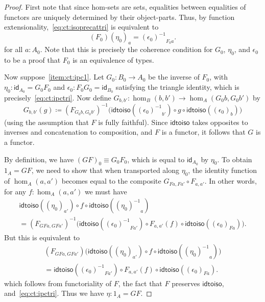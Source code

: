 \documentclass{mscs}
\newcommand{\jdeq}{\equiv}      %
\newcommand{\defeq}{\coloneqq}  %
\newcommand{\opp}[1]{\mathord{{#1}^{-1}}}
\newcommand{\map}[2]{\ensuremath{{#1}\left({#2}\right)}\xspace}
\newcommand{\idfunc}[1][]{\ensuremath{\mathsf{id}_{#1}}\xspace}
\numberwithin{equation}{section}
\newcommand{\inv}[1]{{#1}^{-1}}
\newcommand{\idtoiso}{\ensuremath{\mathsf{idtoiso}}\xspace}
\begin{document}
\begin{proof}
  First note that since hom-sets are sets, equalities between equalities of functors are uniquely determined by their object-parts.
  Thus, by function extensionality,~\eqref{eq:ct:isoprecattri} is equivalent to
  \begin{equation}
    \map{(F_0)}{\eta_0}_a = \opp{(\epsilon_0)}_{F_0 a}.\label{eq:ct:ipctri}
  \end{equation}
  for all $a:A_0$.
  Note that this is precisely the coherence condition for $G_0$, $\eta_0$, and $\epsilon_0$ to be a proof that $F_0$ is an equivalence of types.

  Now suppose~\ref{item:ct:ipc1}.
  Let $G_0:B_0 \to A_0$ be the inverse of $F_0$, with $\eta_0: \idfunc[A_0] = G_0 F_0$ and $\epsilon_0:F_0G_0 = \idfunc[B_0]$ satisfying the triangle identity, which is precisely~\eqref{eq:ct:ipctri}.
  Now define $G_{b,b'}:\hom_B(b,b') \to \hom_A(G_0b,G_0b')$ by
  \[ G_{b,b'}(g) \defeq
  \inv{(F_{G_0b,G_0b'})}\Big(\idtoiso(\opp{(\epsilon_0)}_{b'}) \circ g \circ \idtoiso((\epsilon_0)_b)\Big)
  \]
  (using the assumption that $F$ is fully faithful).
  Since \idtoiso takes opposites to inverses and concatenation to composition, and $F$ is a functor, it follows that $G$ is a functor.

  By definition, we have $(GF)_0 \jdeq G_0 F_0$, which is equal to $\idfunc[A_0]$ by $\eta_0$.
  To obtain $1_A = GF$, we need to show that when transported along $\eta_0$, the identity function of $\hom_A(a,a')$ becomes equal to the composite $G_{Fa,Fa'} \circ F_{a,a'}$.
  In other words, for any $f:\hom_A(a,a')$ we must have
  \begin{multline*}
    \idtoiso((\eta_0)_{a'}) \circ f \circ \idtoiso(\opp{(\eta_0)}_a)\\
    = \inv{(F_{GFa,GFa'})}\Big(\idtoiso(\opp{(\epsilon_0)}_{Fa'})
    \circ F_{a,a'}(f) \circ \idtoiso((\epsilon_0)_{Fa})\Big).
  \end{multline*}
  But this is equivalent to
  \begin{multline*}
    (F_{GFa,GFa'})\Big(\idtoiso((\eta_0)_{a'}) \circ f \circ \idtoiso(\opp{(\eta_0)}_a)\Big)\\
    = \idtoiso(\opp{(\epsilon_0)}_{Fa'})
    \circ F_{a,a'}(f) \circ \idtoiso((\epsilon_0)_{Fa}).
  \end{multline*}
  which follows from functoriality of $F$, the fact that $F$ preserves \idtoiso, and~\eqref{eq:ct:ipctri}.
  Thus we have $\eta:1_A = GF$.


\end{proof}
\end{document}
